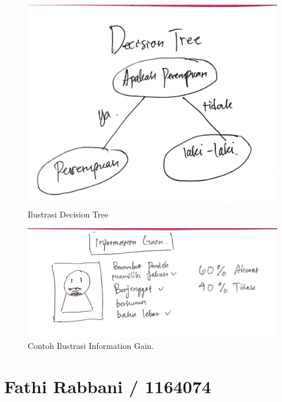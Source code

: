 \begin{figure}[ht]
      \centerline{\includegraphics[width=1\textwidth]
      {figures/c17}}
      \caption{Ilustrasi Decision Tree}
      \label{c17}
      \end{figure}

\begin{figure}[ht]
      \centerline{\includegraphics[width=1\textwidth]
      {figures/c18}}
      \caption{Contoh Ilustrasi Information Gain.}
      \label{c18}
      \end{figure}

\section{Fathi Rabbani / 1164074}
